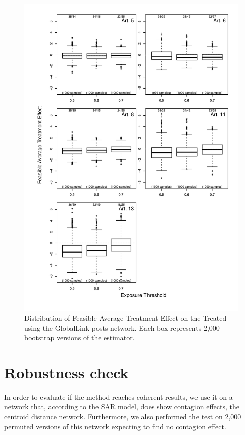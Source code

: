 \documentclass[10pt]{article}
\begin{document}
\begin{figure}[H]
	\centering
	\includegraphics[width=.8\linewidth]{../fig/matching_bloxplot_adjmat_gl_posts.pdf}
	\caption{Distribution of Feasible Average Treatment Effect on the Treated using the GlobalLink posts network. Each box represents 2,000 bootstrap versions of the estimator.}
\end{figure}

\section{Robustness check}

In order to evaluate if the method reaches coherent results, we use it on a network
that, according to the SAR model, does show contagion effects, the centroid distance
network. Furthermore, we also performed the test on 2,000 permuted versions of this
network expecting to find no contagion effect.
\end{document}
